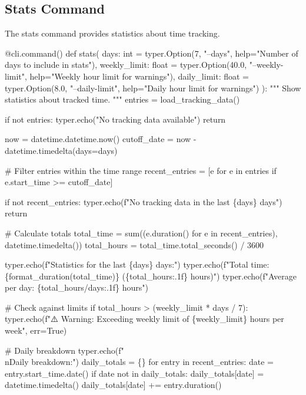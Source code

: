 \subsection{Stats Command}

The stats command provides statistics about time tracking.

\nwenddocs{}\endmoddef\nwstartdeflinemarkup{}\nwenddeflinemarkup
@cli.command()
def stats(
    days: int = typer.Option(7, "--days", help="Number of days to include in stats"),
    weekly_limit: float = typer.Option(40.0, "--weekly-limit", help="Weekly hour limit for warnings"),
    daily_limit: float = typer.Option(8.0, "--daily-limit", help="Daily hour limit for warnings")
):
    """
    Show statistics about tracked time.
    """
    entries = load_tracking_data()
    
    if not entries:
        typer.echo("No tracking data available")
        return
    
    now = datetime.datetime.now()
    cutoff_date = now - datetime.timedelta(days=days)
    
    # Filter entries within the time range
    recent_entries = [e for e in entries if e.start_time >= cutoff_date]
    
    if not recent_entries:
        typer.echo(f"No tracking data in the last \{days\} days")
        return
    
    # Calculate totals
    total_time = sum((e.duration() for e in recent_entries), datetime.timedelta())
    total_hours = total_time.total_seconds() / 3600
    
    typer.echo(f"Statistics for the last \{days\} days:")
    typer.echo(f"Total time: \{format_duration(total_time)\} (\{total_hours:.1f\} hours)")
    typer.echo(f"Average per day: \{total_hours/days:.1f\} hours")
    
    # Check against limits
    if total_hours > (weekly_limit * days / 7):
        typer.echo(f"⚠️  Warning: Exceeding weekly limit of \{weekly_limit\} hours per week", err=True)
    
    # Daily breakdown
    typer.echo(f"\\nDaily breakdown:")
    daily_totals = \{\}
    for entry in recent_entries:
        date = entry.start_time.date()
        if date not in daily_totals:
            daily_totals[date] = datetime.timedelta()
        daily_totals[date] += entry.duration()
    
